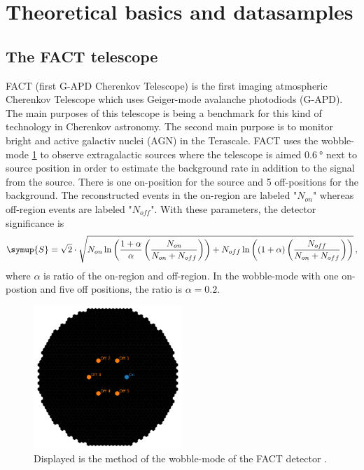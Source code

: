 \section{Theoretical basics and datasamples}
\label{sec:theorie}

\subsection{The FACT telescope}
FACT (first G-APD Cherenkov Telescope) is the first imaging atmospheric Cherenkov Telescope which uses Geiger-mode avalanche photodiods (G-APD).
The main purposes of this telescope is being a benchmark for this kind of technology in Cherenkov astronomy.
The second main purpose is to monitor bright and active galactiv nuclei (AGN) in the Terascale.
FACT uses the wobble-mode \ref{fig:wobble} to observe extragalactic sources where the telescope is aimed $\SI{0.6}{\degree}$ next to
source position in order to estimate the background rate
in addition to the signal from the source. There is one on-position for the source and 5 off-positions for the background.
The reconstructed events in the on-region are labeled "$N_{on}$" whereas off-region events are labeled "$N_{off}$".
With these parameters, the detector significance is
\begin{equation*}
  \symup{S} = \sqrt{2}\cdot \sqrt{N_{on} \ln\left( \frac{1 + \alpha}{\alpha} \left(  \frac{N_{on}}{N_{on} + N_{off}}\right)\right) +
  N_{off} \ln\left( (1 + \alpha) \left(\frac{N_{off}}{N_{on} + N_{off}}\right)\right)} \, ,
\end{equation*}
where $\alpha$ is ratio of the on-region and off-region. In the wobble-mode with one on-postion and five off positions, the ratio is $\alpha = 0.2$.

\begin{figure}[H]
  \centering
  \includegraphics[width=0.5\textwidth]{fact_pics/wobblemode.png}
  \caption{Displayed is the method of the wobble-mode of the FACT detector \cite{ANLEITUNG}.}
  \label{fig:wobble}
\end{figure}

